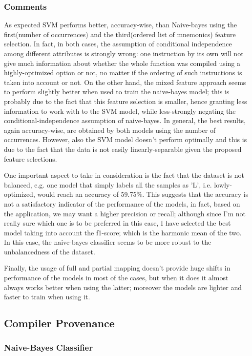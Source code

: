 \documentclass[a4paper]{article}
\begin{document}
\subsubsection{Comments}
As expected SVM performs better, accuracy-wise, than Naive-bayes using the first(number of occurrences) and the third(ordered list of mnemonics) feature selection. In fact, in both cases, the assumption of conditional independence among different attributes is strongly wrong: one instruction by its own will not give much information about whether the whole function was compiled using a highly-optimized option or not, no matter if the ordering of such instructions is taken into account or not. On the other hand, the mixed feature approach seems to perform slightly better when used to train the naive-bayes model; this is probably due to the fact that this feature selection is smaller, hence granting less information to work with to the SVM model, while less-strongly negating the conditional-independence assumption of naive-bayes.
In general, the best results, again accuracy-wise, are obtained by both models using the number of occurrences. However, also the SVM model doesn't perform optimally and this is due to the fact that the data is not easily linearly-separable given the proposed feature selections.

One important aspect to take in consideration is the fact that the dataset is not balanced, e.g. one model that simply labels all the samples as 'L', i.e. lowly-optimized, would reach an accuracy of 59.75\%. This suggests that the accuracy is not a satisfactory indicator of the performance of the models, in fact, based on the application, we may want a higher precision or recall; although since I'm not really sure which one is to be preferred in this case, I have selected the best model taking into account the f1-score; which is the harmonic mean of the two. In this case, the naive-bayes classifier seems to be more robust to the unbalancedness of the dataset. 

Finally, the usage of full and partial mapping doesn't provide huge shifts in performance of the models in most of the cases, but when it does it almost always works better when using the latter; moreover the models are lighter and faster to train when using it.
\newpage
\subsection{Compiler Provenance}
\subsubsection{Naive-Bayes Classifier}
\end{document}
